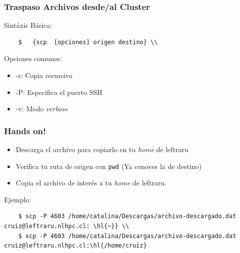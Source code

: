 \documentclass[aspectratio=169,professionalfonts]{beamer}
\begin{document}
\begin{frame}[fragile]
\frametitle{\textbf{Traspaso Archivos desde/al Cluster}}
Sintáxis Básica: \\
\begin{verbatim}
    $   {scp  [opciones] origen destino} \\
\end{verbatim}
\vspace{0.5em}
Opciones comunes:
    \begin{itemize}
        \item -r: Copia recursiva
        \vspace{0.5em}
        \item -P: Especifica el puerto SSH
        \vspace{0.5em}
        \item -v: Modo \textit{verbose}
    \end{itemize}
\end{frame}


\begin{frame}[fragile]
\frametitle{\textbf{Hands on!}}
\begin{itemize}
    \item  Descarga el archivo para copiarlo en tu \textit{home} de leftraru
    \item Verifica tu ruta de origen con \texttt{pwd} (Ya conoces la de destino) 
    \item     Copia el archivo de interés a tu \textit{home} de leftraru.
\end{itemize}
Ejemplo: \\
\begin{verbatim}
    $ scp -P 4603 /home/catalina/Descargas/archivo-descargado.dat cruiz@leftraru.nlhpc.cl: \hl{~}} \\
    $ scp -P 4603 /home/catalina/Descargas/archivo-descargado.dat cruiz@leftraru.nlhpc.cl:\hl{/home/cruiz}
\end{verbatim}
\end{frame}
\end{document}

